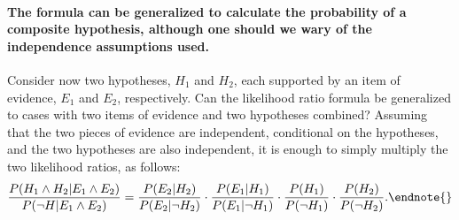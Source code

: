 \documentclass[10pt]{article}
\begin{document}
\paragraph{The formula can be generalized to calculate the probability of a composite hypothesis, although one should we wary 
of the independence assumptions used.} 
Consider now two hypotheses, $H_1$ and $H_2$, each supported by an item of 
evidence, $E_1$ and $E_2$, respectively.  Can the likelihood ratio formula be generalized to cases with 
two items of evidence and two hypotheses combined? Assuming that the two pieces of evidence are independent, conditional on the hypotheses, 
and the two hypotheses are also independent, 
it is enough to simply multiply the two likelihood ratios, as follows:
%
\[ \frac{P(H_1\wedge H_2|E_1 \land E_2)}{P(\neg H | E_1 \land E_2)} = 
	\frac{P(E_2 | H_2)}{P(E_2| \neg H_2)}
	\cdot 
	\frac{P(E_1 | H_1)}{P(E_1| \neg H_1)}
	\cdot 
	\frac{P(H_1)}{P(\neg H_1)}\cdot \frac{P(H_2)}{P(\neg H_2)}.\endnote{}\]
%
\end{document}
